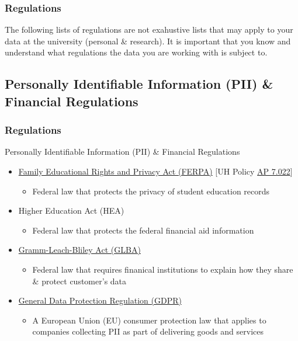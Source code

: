 \begin{frame}
  \frametitle{Regulations}
\begin{block}{}
  The following lists of regulations are not exahustive lists that may apply to your data at the university (personal \& research).
  It is important that you know and understand what regulations the data you are working with is subject to.

\end{block}
\end{frame}

\subsection{Personally Identifiable Information (PII)  \& Financial Regulations}
\begin{frame}
  \frametitle{Regulations}
  \begin{block}{Personally Identifiable Information (PII)  \& Financial Regulations}
    \begin{itemize}
    \item \href{https://studentprivacy.ed.gov/ferpa-regulations}{Family Educational Rights and Privacy Act (FERPA)} [UH Policy \href{https://www.hawaii.edu/policy/?action=viewPolicy\&policySection=ap\&policyChapter=7\&policyNumber=022\&menuView=closed}{AP 7.022}]
      \begin{itemize}
      \item Federal law that protects the privacy of student education records
      \end{itemize}
    
    \item Higher Education Act (HEA)
      \begin{itemize}
      \item Federal law that protects the federal financial aid information
      \end{itemize}
      
    \item \href{https://www.ftc.gov/tips-advice/business-center/privacy-and-security/gramm-leach-bliley-act}{Gramm-Leach-Bliley Act (GLBA)}
      \begin{itemize}
      \item Federal law that requires finanical institutions to explain how they share \& protect customer's data
      \end{itemize}

    \item \href{https://gdpr-info.eu/}{General Data Protection Regulation (GDPR)}
      \begin{itemize}
      \item A European Union (EU) consumer protection law that applies to companies collecting PII as part of delivering goods and services
      \end{itemize}


\end{itemize}
\end{block}
\end{frame}
